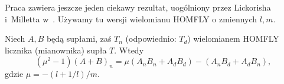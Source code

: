 
Praca \cite{conway70} zawiera jeszcze jeden ciekawy rezultat, uogólniony przez Lickorisha i~Milletta w~\cite[fakt 12]{lickorish87}.
Używamy tu wersji wielomianu HOMFLY o zmiennych $l, m$.

\begin{proposition}
    Niech $A, B$ będą supłami, zaś $T_n$ (odpowiednio: $T_d$)  wielomianem HOMFLY licznika (mianownika) supła $T$.
    Wtedy
    \begin{equation}
        (\mu^2 - 1)(A+B)_n = \mu(A_nB_n + A_dB_d) - (A_nB_d + A_dB_n),
    \end{equation}
    gdzie $\mu = -(l + 1/l)/m$. %
\end{proposition}






